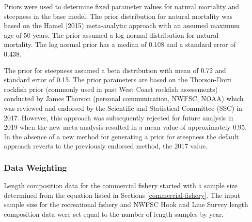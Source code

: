 \documentclass[11pt,
  english,
  a4paper,
]{article}
\begin{document}

Priors were used to determine fixed parameter values for natural mortality and steepness in the base model. The prior distribution for natural mortality was based on the Hamel {(2015)\leavevmode\tagmcend\tagstructend} meta-analytic approach with an assumed maximum age of 50 years. The prior assumed a log normal distribution for natural mortality. The log normal prior has a median of 0.108 and a standard error of 0.438.

\leavevmode\tagmcend\tagstructend\par


The prior for steepness assumed a beta distribution with mean of 0.72 and standard error of 0.15. The prior parameters are based on the Thorson-Dorn rockfish prior (commonly used in past West Coast rockfish assessments) conducted by James Thorson (personal communication, NWFSC, NOAA) which was reviewed and endorsed by the Scientific and Statistical Committee (SSC) in 2017. However, this approach was subsequently rejected for future analysis in 2019 when the new meta-analysis resulted in a mean value of approximately 0.95. In the absence of a new method for generating a prior for steepness the default approach reverts to the previously endorsed method, the 2017 value.

\leavevmode\tagmcend\tagstructend\par


\hypertarget{data-weighting}{%
\subsubsection{Data Weighting}\label{data-weighting}}

\leavevmode\tagmcend\tagstructend


Length composition data for the commercial fishery started with a sample size determined from the equation listed in Sections \ref{commercial-fishery}. The input sample size for the recreational fishery and NWFSC Hook and Line Survey length composition data were set equal to the number of length samples by year.

\leavevmode\tagmcend\tagstructend\par
\end{document}
